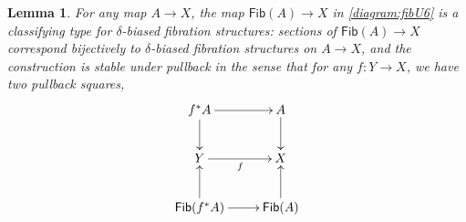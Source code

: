 \documentclass[12pt]{article}
\newcommand{\ra}{\ensuremath{\rightarrow}}
\newcommand{\Fib}{\ensuremath{\mathsf{Fib}}}
\newtheorem{lemma}[theorem]{Lemma}
\theoremstyle{remark}
\theoremstyle{definition}
\begin{document}
\begin{lemma}\label{lemma:classtypebiasedfibstruct}
For any map $A\ra X$, the map $\Fib(A)\ra X$  in \eqref{diagram:fibU6} is a \emph{classifying type for $\delta$-biased fibration structures}: sections of $\Fib(A)\ra X$ correspond bijectively to $\delta$-biased fibration structures on $A\ra X$, and the construction is stable under pullback in the sense that for any $f:Y\ra X$, we have two pullback squares,
\begin{equation}\label{diagram:Fibstable}
\xymatrix{
f^*A \ar[d] \ar[r]  & A \ar[d]\\
Y \ar[r]_{f} &X\\
\Fib(f^*A)\ar[u] \ar[r] & \Fib(A)\ar[u].
}
\end{equation}
\end{lemma}
\end{document}
